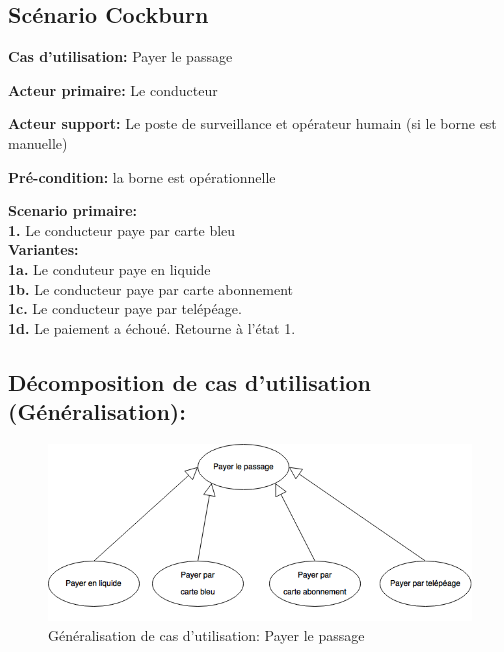 \subsection{Scénario Cockburn}
\textbf{Cas d'utilisation:} Payer le passage

\textbf{Acteur primaire:} Le conducteur

\textbf{Acteur support:} Le poste de surveillance et opérateur humain (si le borne est manuelle)

\textbf{Pré-condition: }  la borne est opérationnelle

\textbf{Scenario primaire: } \\ 
    \textbf{1.} Le conducteur paye par carte bleu %
    \\ 

\textbf{Variantes:}\\
    \textbf{1a.} Le conduteur paye en liquide %
    \\
    \textbf{1b.} Le conducteur paye par carte abonnement %
    \\
     \textbf{1c.} Le conducteur paye par telépéage.
     \\
    \textbf{1d.} Le paiement a échoué. Retourne à l’état 1. \\ %

\subsection{Décomposition de cas d'utilisation (Généralisation):} 
\begin{figure}[h]
    \centering
    \includegraphics[scale=0.5]{02_Desenvolvimento/TD2/images/PayeGeneralisation.png}
    \caption{Généralisation de cas d'utilisation: Payer le passage}
\end{figure}

